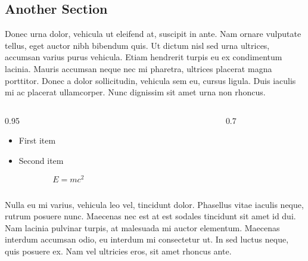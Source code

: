 \documentclass[final]{beamer}
\newcommand{\figfont}{\normalsize} %
\begin{document}
\begin{poster}
{}

\newcolumn

\section{Another Section} \justifying
Donec urna dolor, vehicula ut eleifend at, suscipit in ante. Nam ornare vulputate tellus, eget auctor nibh bibendum quis. Ut dictum nisl sed urna ultrices, accumsan varius purus vehicula. Etiam hendrerit turpis eu ex condimentum lacinia. Mauris accumsan neque nec mi pharetra, ultrices placerat magna porttitor. Donec a dolor sollicitudin, vehicula sem eu, cursus ligula. Duis iaculis mi ac placerat ullamcorper. Nunc dignissim sit amet urna non rhoncus.

\vspace{2ex}
\newcommand{\figwidth}{0.7\columnwidth}
\begin{columns}[c]
    \begin{column}{0.95\columnwidth-\figwidth}
        \begin{itemize}   \itemsep15pt    
            \item First item
            \item Second item
        \end{itemize}
        
        $$
          E = mc^2
        $$
        
    \end{column}
    
    \begin{column}{0.005\columnwidth}
    \end{column}
    
    \begin{column}{\figwidth}
        \centering{
            \figfont
            
            \vspace*{1ex}
            \caption{Figure name} 
        } 
    \end{column}
\end{columns}

Nulla eu mi varius, vehicula leo vel, tincidunt dolor. Phasellus vitae iaculis neque, rutrum posuere nunc. Maecenas nec est at est sodales tincidunt sit amet id dui. Nam lacinia pulvinar turpis, at malesuada mi auctor elementum. Maecenas interdum accumsan odio, eu interdum mi consectetur ut. In sed luctus neque, quis posuere ex. Nam vel ultricies eros, sit amet rhoncus ante.


\end{poster}
\end{document}
